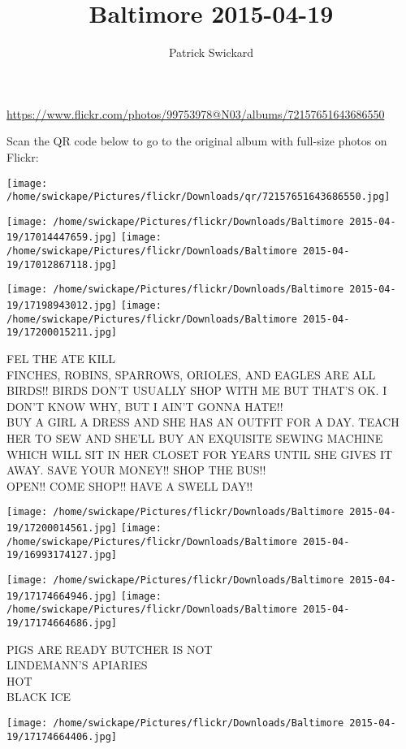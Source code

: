 \documentclass[10pt,letterpaper]{article}
\title{Baltimore 2015-04-19}
\author{Patrick Swickard}
\date{}
\begin{document}
\maketitle

\url{https://www.flickr.com/photos/99753978@N03/albums/72157651643686550}

Scan the QR code below to go to the original album with full-size photos on Flickr:

\texttt{[image: /home/swickape/Pictures/flickr/Downloads/qr/72157651643686550.jpg]}
\pagebreak

\texttt{[image: /home/swickape/Pictures/flickr/Downloads/Baltimore 2015-04-19/17014447659.jpg]}
\texttt{[image: /home/swickape/Pictures/flickr/Downloads/Baltimore 2015-04-19/17012867118.jpg]}

\texttt{[image: /home/swickape/Pictures/flickr/Downloads/Baltimore 2015-04-19/17198943012.jpg]}
\texttt{[image: /home/swickape/Pictures/flickr/Downloads/Baltimore 2015-04-19/17200015211.jpg]}

FEL THE ATE KILL\\
FINCHES, ROBINS, SPARROWS, ORIOLES, AND EAGLES ARE ALL BIRDS!!  BIRDS DON'T USUALLY SHOP WITH ME BUT THAT'S OK.  I DON'T KNOW WHY, BUT I AIN'T GONNA HATE!!\\
BUY A GIRL A DRESS AND SHE HAS AN OUTFIT FOR A DAY.  TEACH HER TO SEW AND SHE'LL BUY AN EXQUISITE SEWING MACHINE WHICH WILL SIT IN HER CLOSET FOR YEARS UNTIL SHE GIVES IT AWAY.  SAVE YOUR MONEY!! SHOP THE BUS!!\\
OPEN!! COME SHOP!! HAVE A SWELL DAY!!
\pagebreak

\texttt{[image: /home/swickape/Pictures/flickr/Downloads/Baltimore 2015-04-19/17200014561.jpg]}
\texttt{[image: /home/swickape/Pictures/flickr/Downloads/Baltimore 2015-04-19/16993174127.jpg]}

\texttt{[image: /home/swickape/Pictures/flickr/Downloads/Baltimore 2015-04-19/17174664946.jpg]}
\texttt{[image: /home/swickape/Pictures/flickr/Downloads/Baltimore 2015-04-19/17174664686.jpg]}

PIGS ARE READY BUTCHER IS NOT\\
LINDEMANN'S APIARIES\\
HOT\\
BLACK ICE
\pagebreak

\texttt{[image: /home/swickape/Pictures/flickr/Downloads/Baltimore 2015-04-19/17174664406.jpg]}
\end{document}
